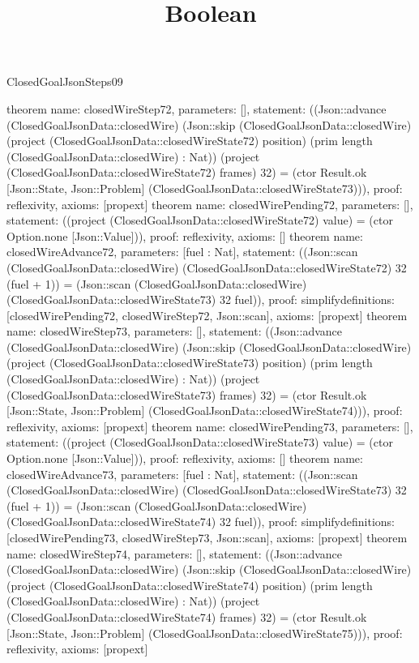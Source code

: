 \begin{lexlean}{ClosedGoalJsonSteps09}
\title{Boolean}
\begin{semanticmodule}
theorem{
 name: closedWireStep72, parameters: [],
 statement: ((Json::advance (ClosedGoalJsonData::closedWire) (Json::skip (ClosedGoalJsonData::closedWire) (project (ClosedGoalJsonData::closedWireState72) position) (prim length (ClosedGoalJsonData::closedWire) : Nat)) (project (ClosedGoalJsonData::closedWireState72) frames) 32) = (ctor Result.ok [Json::State, Json::Problem] (ClosedGoalJsonData::closedWireState73))), proof: reflexivity{}, axioms: [propext]
}
theorem{
 name: closedWirePending72, parameters: [],
 statement: ((project (ClosedGoalJsonData::closedWireState72) value) = (ctor Option.none [Json::Value])), proof: reflexivity{}, axioms: []
}
theorem{
 name: closedWireAdvance72, parameters: [fuel : Nat],
 statement: ((Json::scan (ClosedGoalJsonData::closedWire) (ClosedGoalJsonData::closedWireState72) 32 (fuel + 1)) = (Json::scan (ClosedGoalJsonData::closedWire) (ClosedGoalJsonData::closedWireState73) 32 fuel)), proof: simplify{definitions: [closedWirePending72, closedWireStep72, Json::scan]}, axioms: [propext]
}
theorem{
 name: closedWireStep73, parameters: [],
 statement: ((Json::advance (ClosedGoalJsonData::closedWire) (Json::skip (ClosedGoalJsonData::closedWire) (project (ClosedGoalJsonData::closedWireState73) position) (prim length (ClosedGoalJsonData::closedWire) : Nat)) (project (ClosedGoalJsonData::closedWireState73) frames) 32) = (ctor Result.ok [Json::State, Json::Problem] (ClosedGoalJsonData::closedWireState74))), proof: reflexivity{}, axioms: [propext]
}
theorem{
 name: closedWirePending73, parameters: [],
 statement: ((project (ClosedGoalJsonData::closedWireState73) value) = (ctor Option.none [Json::Value])), proof: reflexivity{}, axioms: []
}
theorem{
 name: closedWireAdvance73, parameters: [fuel : Nat],
 statement: ((Json::scan (ClosedGoalJsonData::closedWire) (ClosedGoalJsonData::closedWireState73) 32 (fuel + 1)) = (Json::scan (ClosedGoalJsonData::closedWire) (ClosedGoalJsonData::closedWireState74) 32 fuel)), proof: simplify{definitions: [closedWirePending73, closedWireStep73, Json::scan]}, axioms: [propext]
}
theorem{
 name: closedWireStep74, parameters: [],
 statement: ((Json::advance (ClosedGoalJsonData::closedWire) (Json::skip (ClosedGoalJsonData::closedWire) (project (ClosedGoalJsonData::closedWireState74) position) (prim length (ClosedGoalJsonData::closedWire) : Nat)) (project (ClosedGoalJsonData::closedWireState74) frames) 32) = (ctor Result.ok [Json::State, Json::Problem] (ClosedGoalJsonData::closedWireState75))), proof: reflexivity{}, axioms: [propext]
}
\end{semanticmodule}
\end{lexlean}

